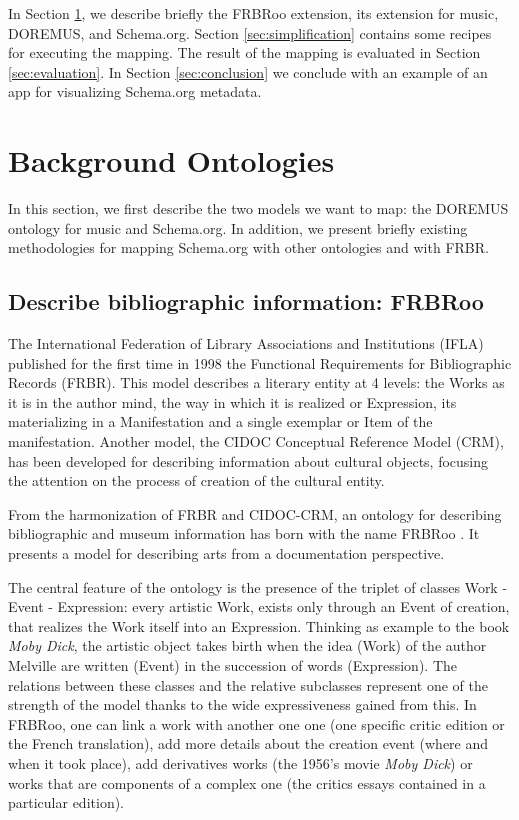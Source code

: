 \documentclass{llncs}
\begin{document}
In Section \ref{sec:background}, we describe briefly the FRBRoo extension, its extension for music, DOREMUS, and Schema.org. Section \ref{sec:simplification} contains some recipes for executing the mapping. The result of the mapping is evaluated in Section \ref{sec:evaluation}. In Section \ref{sec:conclusion} we conclude with an example of an app for visualizing Schema.org metadata.


\section{Background Ontologies}
\label{sec:background}
In this section, we first describe the two models we want to map: the DOREMUS ontology for music and Schema.org. In addition, we present briefly existing methodologies for mapping Schema.org with other ontologies and with FRBR.

\subsection{Describe bibliographic information: FRBRoo}

The International Federation of Library Associations and Institutions (IFLA) published for the first time in 1998 the Functional Requirements for Bibliographic Records (FRBR). This model describes a literary entity at 4 levels: the Works as it is in the author mind, the way in which it is realized or Expression, its materializing in a  Manifestation and a single exemplar or Item of the manifestation. Another model, the CIDOC Conceptual Reference Model (CRM), has been developed for describing information about cultural objects, focusing the attention on the process of creation of the cultural entity.

From the harmonization of FRBR and CIDOC-CRM, an ontology for describing bibliographic and museum information has born with the name FRBRoo \cite{doerr2008frbroo}. It presents a model for describing arts from a documentation perspective.

The central feature of the ontology is the presence of the triplet of classes Work - Event - Expression: every artistic Work, exists only through an Event of creation, that realizes the Work itself into an Expression. Thinking as example to the book \textit{Moby Dick}, the artistic object takes birth when the idea (Work) of the author Melville are written (Event) in the succession of words (Expression). The relations between these classes and the relative subclasses represent one of the strength of the model thanks to the wide expressiveness gained from this. In FRBRoo, one can link a work with another one one (one specific critic edition or the French translation), add more details about the creation event (where and when it took place), add derivatives works (the 1956's movie \textit{Moby Dick}) or works that are components of a complex one (the critics essays contained in a particular edition).
\end{document}
